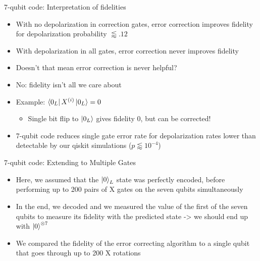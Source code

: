 \documentclass{beamer}
\begin{document}
\begin{frame}{7-qubit code: Interpretation of fidelities}
  \begin{itemize}
  \item With no depolarization in correction gates, error correction improves fidelity for depolarization probability $\lessapprox .12$
  \item With depolarization in all gates, error correction never improves fidelity
    \pause
  \item Doesn't that mean error correction is never helpful?
    \pause
  \item No: fidelity isn't all we care about
  \item Example: $\left\langle{0_L}\right\vert X^{(i)}\left\vert{0_L}\right\rangle=0$
    \begin{itemize}
    \item Single bit flip to $\left\vert{0_L}\right\rangle$ gives fidelity $0$, but can be corrected!
    \end{itemize}
    \pause
  \item 7-qubit code reduces single gate error rate for depolarization rates lower than detectable by our qiskit simulations ($p\lessapprox 10^{-4}$)
  \end{itemize}
\end{frame}

\begin{frame}{7-qubit code: Extending to Multiple Gates}
    \begin{itemize}
        \item <1-> Here, we assumed that the $\left\vert{0}\right\rangle_L$ state was perfectly encoded, before performing up to 200 pairs of X gates on the seven qubits simultaneously
        \item <2-> In the end, we decoded and we measured the value of the first of the seven qubits to measure its fidelity with the predicted state -> we should end up with $\left\vert{0}\right\rangle^{\otimes 7}$
        \item <3-> We compared the fidelity of the error correcting algorithm to a single qubit that goes through up to 200 X rotations
    \end{itemize}
\end{frame}
\end{document}
